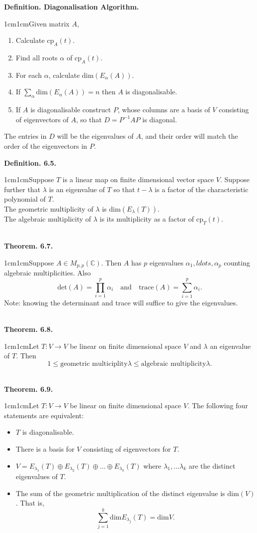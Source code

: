 \documentclass{article}
\newcommand{\definition}[2]{\textbf{Definition. #1.}\begin{adjustwidth}{1cm}{1cm}#2\end{adjustwidth}}
\newcommand{\theorem}[2]{\textbf{Theorem. #1.}\begin{adjustwidth}{1cm}{1cm}#2\end{adjustwidth}}
\begin{document}
\definition{Diagonalisation Algorithm}{Given matrix $A$,
\begin{enumerate}
  \item Calculate $\text{cp}_A(t)$.
  \item Find all roots $\alpha$ of $\text{cp}_A(t)$.
  \item For each $\alpha$, calculate $\text{dim}(E_\alpha(A))$.
  \item If $\sum_\alpha \text{dim}(E_\alpha(A)) = n$ then $A$ is diagonalisable.
  \item If $A$ is diagonalisable construct $P$, whose columns are a basis of $V$ consisting of eigenvectors of $A$, so that $D=P^{-1}AP$ is diagonal.
\end{enumerate}
The entries in $D$ will be the eigenvalues of $A$, and their order will match the order of the eigenvectors in $P$.}\newpage
\definition{6.5}{Suppose $T$ is a linear map on finite dimensional vector space $V$. Suppose further that $\lambda$ is an eigenvalue of $T$ so that $t - \lambda$ is a factor of the characteristic polynomial of $T$.\\The geometric multiplicity of $\lambda$ is $\text{dim}(E_\lambda(T))$.\\The algebraic multiplicity of $\lambda$ is its multiplicity as a factor of $\text{cp}_T(t)$.}~\\
\theorem{6.7}{Suppose $A \in M_{p,p}(\mathbb{C})$. Then $A$ has $p$ eigenvalues $\alpha_1, ldots, \alpha_p$ counting algebraic multiplicities. Also \[\text{det}(A) = \prod_{i=1}^p \alpha_i \quad \text{and} \quad \text{trace}(A) = \sum_{i=1}^p \alpha_i.\]Note: knowing the determinant and trace will suffice to give the eigenvalues.}~\\
\theorem{6.8}{Let $T: V \rightarrow V$ be linear on finite dimensional space $V$ and $\lambda$ an eigenvalue of $T$. Then \[1 \leq \text{geometric multiciplity} \lambda \leq \text{algebraic multiplicity} \lambda.\]}~\\
\theorem{6.9}{Let $T: V \rightarrow V$ be linear on finite dimensional space $V$. The following four statements are equivalent:
\begin{itemize}
  \item $T$ is diagonalisable.
  \item There is a basis for $V$ consisting of eigenvectors for $T$.
  \item $V = E_{\lambda_1}(T) \oplus E_{\lambda_2}(T) \oplus \ldots \oplus E_{\lambda_k}(T)$ where $\lambda_1, \ldots \lambda_k$ are the distinct eigenvalues of $T$.
  \item The sum of the geometric multiplication of the distinct eigenvalue is $\text{dim}(V)$. That is, \[\sum_{j=1}^k \text{dim}E_{\lambda_j}(T) = \text{dim}V.\]
\end{itemize}}
\end{document}
